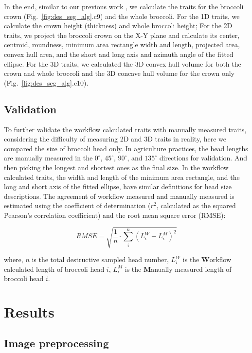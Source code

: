 In the end, similar to our previous work \citep{feldman_easydcp_2021}, we calculate the traits for the broccoli crown (Fig.~\ref{fig:des_seg_alg}.c9) and the whole broccoli. For the 1D traits, we calculate the crown height (thickness) and whole broccoli height; For the 2D traits, we project the broccoli crown on the X-Y plane and calculate its center, centroid, roundness, minimum area rectangle width and length, projected area, convex hull area, and the short and long axis and azimuth angle of the fitted ellipse. For the 3D traits, we calculated the 3D convex hull volume for both the crown and whole broccoli and the 3D concave hull volume for the crown only (Fig.~\ref{fig:des_seg_alg}.c10).

\subsection{Validation}

To further validate the workflow calculated traits with manually measured traits, considering the difficulty of measuring 2D and 3D traits in reality, here we compared the size of broccoli head only. In agriculture practices, the head lengths are manually measured in the $0^\circ$, $45^\circ$, $90^\circ$, and $135^\circ$ directions for validation. And then picking the longest and shortest ones as the final size. In the workflow calculated traits, the width and length of the minimum area rectangle, and the long and short axis of the fitted ellipse, have similar definitions for head size descriptions. The agreement of workflow measured and manually measured is estimated using the coefficient of determination ($r^2$, calculated as the squared Pearson's correlation coefficient) and the root mean square error (RMSE):

\begin{equation}
  RMSE = \sqrt{\frac{1}{n} \cdot \sum_{i}^{n} (L_{i}^{W} - L_{i}^{M})^2}
\end{equation}

\noindent
where, $n$ is the total destructive sampled head number, $L_{i}^{W}$ is the  \textbf{W}orkflow calculated length of broccoli head $i$, $L_{i}^{M}$ is the \textbf{M}anually measured length of broccoli head $i$.

\section{Results}

\subsection{Image preprocessing}

